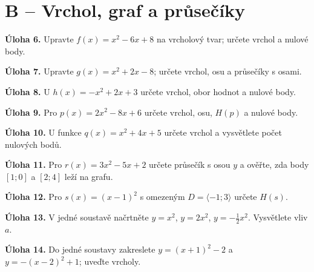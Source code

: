 \documentclass[11pt,a4paper]{article}
\begin{document}
\section*{B – Vrchol, graf a průsečíky}
\noindent\textbf{Úloha 6.} Upravte $f(x)=x^2-6x+8$ na vrcholový tvar; určete vrchol a nulové body.\par
\vspace{10mm}\par
\noindent\textbf{Úloha 7.} Upravte $g(x)=x^2+2x-8$; určete vrchol, osu a průsečíky s osami.\par
\vspace{10mm}\par
\noindent\textbf{Úloha 8.} U $h(x)=-x^2+2x+3$ určete vrchol, obor hodnot a nulové body.\par
\vspace{10mm}\par
\noindent\textbf{Úloha 9.} Pro $p(x)=2x^2-8x+6$ určete vrchol, osu, $H(p)$ a nulové body.\par
\vspace{10mm}\par
\noindent\textbf{Úloha 10.} U funkce $q(x)=x^2+4x+5$ určete vrchol a vysvětlete počet nulových bodů.\par
\vspace{10mm}\par
\noindent\textbf{Úloha 11.} Pro $r(x)=3x^2-5x+2$ určete průsečík s osou $y$ a ověřte, zda body $[1;0]$ a $[2;4]$ leží na grafu.\par
\vspace{10mm}\par
\noindent\textbf{Úloha 12.} Pro $s(x)=(x-1)^2$ s omezeným $D=\langle-1;3\rangle$ určete $H(s)$.\par
\vspace{10mm}\par
\newpage
\noindent\textbf{Úloha 13.} V jedné soustavě načrtněte $y=x^2$, $y=2x^2$, $y=-\frac12x^2$. Vysvětlete vliv $a$.\par
\begin{center}\end{center}
\noindent\textbf{Úloha 14.} Do jedné soustavy zakreslete $y=(x+1)^2-2$ a $y=-(x-2)^2+1$; uveďte vrcholy.\par
\begin{center}\end{center}
\newpage
\end{document}
